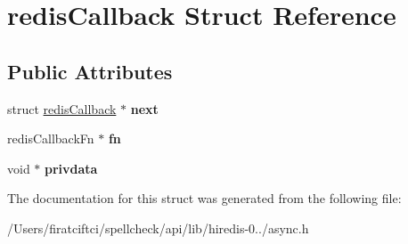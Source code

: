 \hypertarget{structredis_callback}{}\section{redis\+Callback Struct Reference}
\label{structredis_callback}
\subsection*{Public Attributes}
\begin{DoxyCompactItemize}
\item 
\mbox{\label{structredis_callback_a36a17df8e50227108adb39ebb7f1a30e}} 
struct \mbox{\hyperlink{structredis_callback}{redis\+Callback}} $\ast$ {\bfseries next}
\item 
\mbox{\label{structredis_callback_a2f1bf051a5288a92a21eae88c388d620}} 
redis\+Callback\+Fn $\ast$ {\bfseries fn}
\item 
\mbox{\label{structredis_callback_ac7c635c7a1a0b69300602b0fddd49a15}} 
void $\ast$ {\bfseries privdata}
\end{DoxyCompactItemize}


The documentation for this struct was generated from the following file\+:\begin{DoxyCompactItemize}
\item 
/\+Users/firatciftci/spellcheck/api/lib/hiredis-\/0../async.\+h\end{DoxyCompactItemize}
